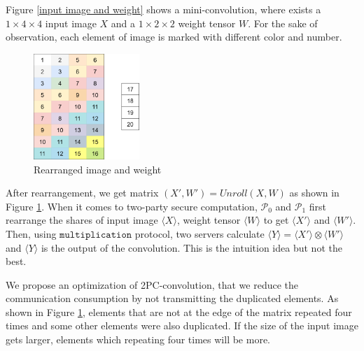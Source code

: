 \documentclass[letterpaper]{article} %
\begin{document}
    Figure \ref{input image and weight} shows a mini-convolution, 
    where exists a $1\times 4\times 4$ input image $X$  and a $1\times 2\times 2$ weight tensor $W$.
    For the sake of observation, each element of image is marked with different color and number.
    

    \begin{figure}[htbp]
        \centering
        \includegraphics[width=4cm]{new_unrolling2.png}
        \caption{Rearranged image and weight}
        \label{rearrangement of image and weight}
    \end{figure}
    
    After rearrangement, we get matrix $(X',W')=Unroll(X,W)$ as shown in Figure \ref{rearrangement of image and weight}.
    When it comes to two-party secure computation, 
    $\mathcal{P}_{0}$ and $\mathcal{P}_{1}$ first rearrange the shares of input image $\langle X\rangle$, 
    weight tensor $\langle W\rangle$
    to get $\langle X'\rangle$ and $\langle W'\rangle$.
    Then, using $\mathtt{multiplication}$ protocol, 
    two servers calculate $\langle Y\rangle=\langle X'\rangle\otimes \langle W'\rangle$    
    and $\langle Y\rangle$ is the output of the convolution.
    This is the intuition idea but not the best.

    We propose an optimization of 2PC-convolution,
    that we reduce the communication consumption by not transmitting the duplicated elements.
    As shown in Figure \ref{rearrangement of image and weight},
    elements that are not at the edge of the matrix repeated four times 
    and some other elements were also duplicated. 
    If the size of the input image gets larger, elements which repeating four times will be more.
\end{document}
